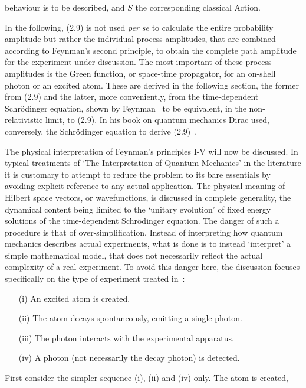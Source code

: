 {     behaviour is to be described, and $S$ the corresponding classical Action.
     \par In the following, (2.9) is not used {\it per se} to calculate the entire probability
      amplitude but rather the individual process amplitudes, that are combined according to
      Feynman's second principle, to obtain the complete path amplitude for the
      experiment under discussion. The most important of these process amplitudes is the Green function,
     or space-time propagator, for an on-shell photon or an excited atom.
      These are derived in the following section, the former from
     (2.9) and the latter, more conveniently, from the time-dependent
      Schr\"{o}dinger equation, shown by Feynman~\cite{Feyn5,Feyn6} to be equivalent, in
      the non-relativistic limit, to (2.9).
      In his book on quantum mechanics Dirac used, conversely, the Schr\"{o}dinger equation
      to derive (2.9)~\cite{Dirac1}.
      \par The physical interpretation of Feynman's principles I-V will now be discussed.
    In typical treatments of `The Interpretation of Quantum Mechanics' in the literature
     it is customary to attempt to reduce the problem to its bare essentials by avoiding
    explicit reference to any actual application. The physical meaning of Hilbert space
    vectors, or wavefunctions, is discussed in complete generality, the dynamical content
    being limited to the `unitary evolution' of fixed energy solutions of the
    time-dependent Schr\"{o}dinger equation. The danger of such a procedure is that of
    over-simplification. Instead of interpreting how quantum mechanics describes actual
    experiments, what is done is to instead `interpret' a simple mathematical model, that
    does not necessarily reflect the actual complexity of a real experiment.
    To avoid this danger here, the discussion focuses specifically on the type of experiment
    treated in~\cite{Feyn1}:
    \begin{itemize}
     \item[(i)] An excited atom is created.
     \item[(ii)] The atom decays spontaneously, emitting a single photon.
      \item[(iii)] The photon interacts with the experimental apparatus.
      \item[(iv)] A photon (not necessarily the decay photon) is detected.
     \end{itemize}
     First consider the simpler sequence (i), (ii) and (iv) only. The atom is created,
}
